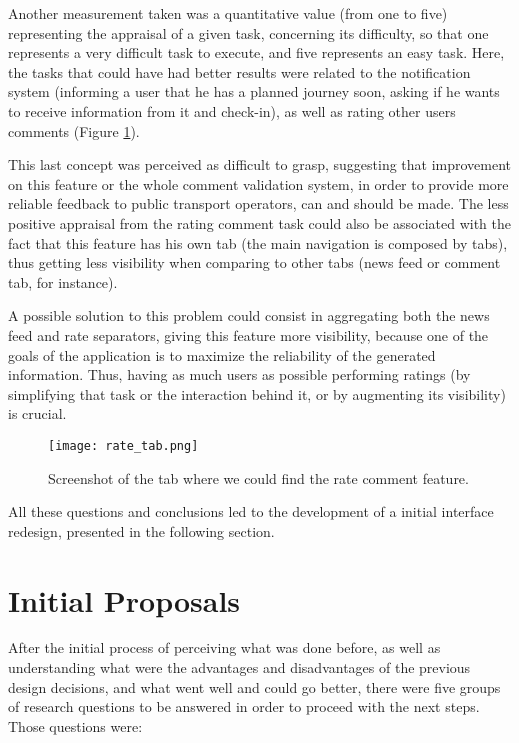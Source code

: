 Another measurement taken was a quantitative value (from one to five) representing the appraisal of a given task, concerning its difficulty, so that one represents a very difficult task to execute, and five represents an easy task.
Here, the tasks that could have had better results were related to the notification system (informing a user that he has a planned journey soon, asking if he wants to receive information from it and check-in), as well as rating other users comments (Figure \ref{fig:rate_tab}). 

This last concept was perceived as difficult to grasp, suggesting that improvement on this feature or the whole comment validation system, in order to provide more reliable feedback to public transport operators, can and should be made.
The less positive appraisal from the rating comment task could also be associated with the fact that this feature has his own tab (the main navigation is composed by tabs), thus getting less visibility when comparing to other tabs (news feed or comment tab, for instance). 

A possible solution to this problem could consist in aggregating both the news feed and rate separators, giving this feature more visibility, because one of the goals of the application is to maximize the reliability of the generated information. Thus, having as much users as possible performing ratings (by simplifying that task or the interaction behind it, or by augmenting its visibility) is crucial.

\begin{figure}[h!]
  \begin{center}
    \leavevmode
    \texttt{[image: rate\_tab.png]}
    \caption{Screenshot of the tab where we could find the rate comment feature.}
    \label{fig:rate_tab}
  \end{center}
\end{figure}

\pagebreak

All these questions and conclusions led to the development of a initial interface redesign, presented in the following section.

\section{Initial Proposals}\label{sec:initial}

After the initial process of perceiving what was done before, as well as understanding what were the advantages and disadvantages of the previous design decisions, and what went well and could go better, there were five groups of research questions to be answered in order to proceed with the next steps. Those questions were:

